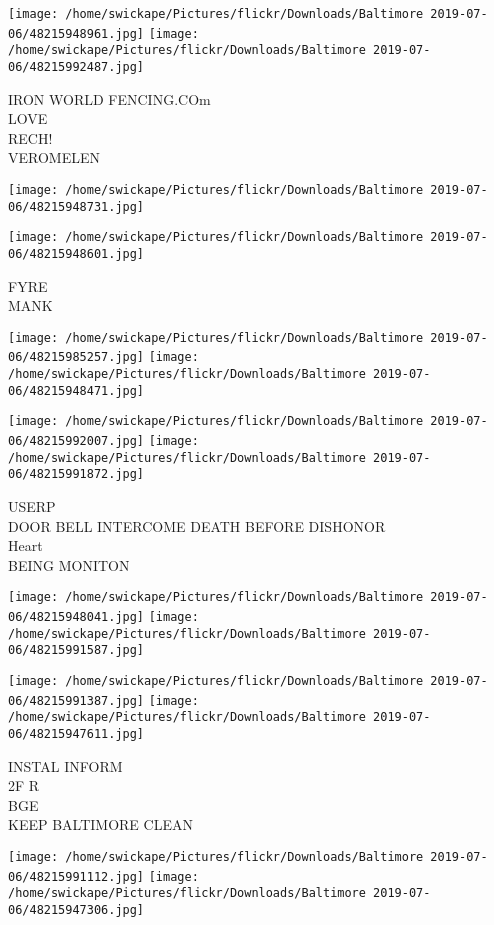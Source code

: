 \documentclass[10pt,letterpaper]{article}
\begin{document}
\texttt{[image: /home/swickape/Pictures/flickr/Downloads/Baltimore 2019-07-06/48215948961.jpg]}
\texttt{[image: /home/swickape/Pictures/flickr/Downloads/Baltimore 2019-07-06/48215992487.jpg]}

IRON WORLD FENCING.COm\\
LOVE\\
RECH!\\
VEROMELEN
\pagebreak

\texttt{[image: /home/swickape/Pictures/flickr/Downloads/Baltimore 2019-07-06/48215948731.jpg]}

\vspace{0.25in}
\texttt{[image: /home/swickape/Pictures/flickr/Downloads/Baltimore 2019-07-06/48215948601.jpg]}

FYRE\\
MANK
\pagebreak

\texttt{[image: /home/swickape/Pictures/flickr/Downloads/Baltimore 2019-07-06/48215985257.jpg]}
\texttt{[image: /home/swickape/Pictures/flickr/Downloads/Baltimore 2019-07-06/48215948471.jpg]}

\texttt{[image: /home/swickape/Pictures/flickr/Downloads/Baltimore 2019-07-06/48215992007.jpg]}
\texttt{[image: /home/swickape/Pictures/flickr/Downloads/Baltimore 2019-07-06/48215991872.jpg]}

USERP\\
DOOR BELL INTERCOME DEATH BEFORE DISHONOR\\
Heart\\
BEING MONITON
\pagebreak

\texttt{[image: /home/swickape/Pictures/flickr/Downloads/Baltimore 2019-07-06/48215948041.jpg]}
\texttt{[image: /home/swickape/Pictures/flickr/Downloads/Baltimore 2019-07-06/48215991587.jpg]}

\texttt{[image: /home/swickape/Pictures/flickr/Downloads/Baltimore 2019-07-06/48215991387.jpg]}
\texttt{[image: /home/swickape/Pictures/flickr/Downloads/Baltimore 2019-07-06/48215947611.jpg]}

INSTAL INFORM\\
2F R\\
BGE\\
KEEP BALTIMORE CLEAN
\pagebreak

\texttt{[image: /home/swickape/Pictures/flickr/Downloads/Baltimore 2019-07-06/48215991112.jpg]}
\texttt{[image: /home/swickape/Pictures/flickr/Downloads/Baltimore 2019-07-06/48215947306.jpg]}
\end{document}
